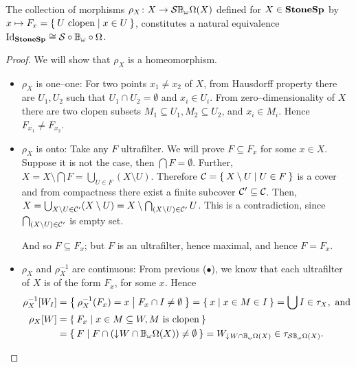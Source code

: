 \begin{proposition}
    The collection of morphisms $\rho_X\colon X \to \mathcal{S}\mathbb{B}_{\omega}\Omega(X)$ defined for $X \in \mathbf{StoneSp}$ by $x \mapsto F_x = \Set{U\text{ clopen} | x\in U }$, constitutes a natural equivalence $\operatorname{Id}_{\mathbf{StoneSp}} \cong \mathcal{S}\circ\mathbb{B}_{\omega}\circ\Omega$.
\end{proposition}
\begin{proof}
    We will show that $\rho_X$ is a homeomorphism.
    \begin{itemize}
        \item $\rho_X$ is one--one: For two points $x_1 \neq x_2$ of $X$, from Hausdorff property there are $U_1, U_2$ such that $U_1\cap U_2 = \emptyset$ and $x_i\in U_i$. From zero--dimensionality of $X$ there are two clopen subsets $M_1 \subseteq U_1, M_2 \subseteq U_2$, and $x_i \in M_i$. Hence $F_{x_1} \neq F_{x_2}$.

        \item $\rho_X$ is onto: Take any $F$ ultrafilter. We will prove $F \subseteq F_x$ for some $x\in X$. Suppose it is not the case, then $\bigcap F = \emptyset$. Further, $X = X \setminus \bigcap F = \bigcup_{U\in F} (X\setminus U)$. Therefore $\mathcal{ C } = \Set{X \setminus U | U\in F}$ is a cover and from compactness there exist a finite subcover $\mathcal{ C }'\subseteq \mathcal{ C }$. Then, $X = \bigcup_{X \setminus U\in \mathcal{ C }'} (X\setminus U) = X \setminus \bigcap_{(X \setminus U)\in \mathcal{ C }'} U$. This is a contradiction, since $\bigcap_{(X \setminus U)\in \mathcal{ C }'}$ is empty set.

        And so $F \subseteq F_x$; but $F$ is an ultrafilter, hence maximal, and hence $F = F_x$.

        \item $\rho_X$ and $\rho_X^{-1}$ are continuous: From previous ($\bullet$), we know that each ultrafilter of $X$ is of the form $F_x$, for some $x$. Hence
        \begin{align*}
            \rho_X^{-1}[W_I] &= \Set{ \rho_X^{-1}(F_x) = x | F_x \cap I \neq \emptyset}
                = \Set{ x | x \in M \in I } = \bigcup I \in \tau_X, \text{ and}\\
            \rho_X[W] &= \Set{ F_x | x \in M \subseteq W, M \text{ is clopen}} \\
                      &= \Set{ F | F \cap (\mathord{\downarrow}\mkern1muW \cap \ensuremath{\mathbb{B}_{\omega}}\Omega(X)) \neq \emptyset} = W_{\mathord{\downarrow}\mkern1mu W \cap \mathbb{B}_{\omega}\Omega(X)} \in \tau_{\mathcal{S}\mathbb{B}_{\omega}\Omega(X)}.
        \end{align*}
    \end{itemize}


\end{proof}
